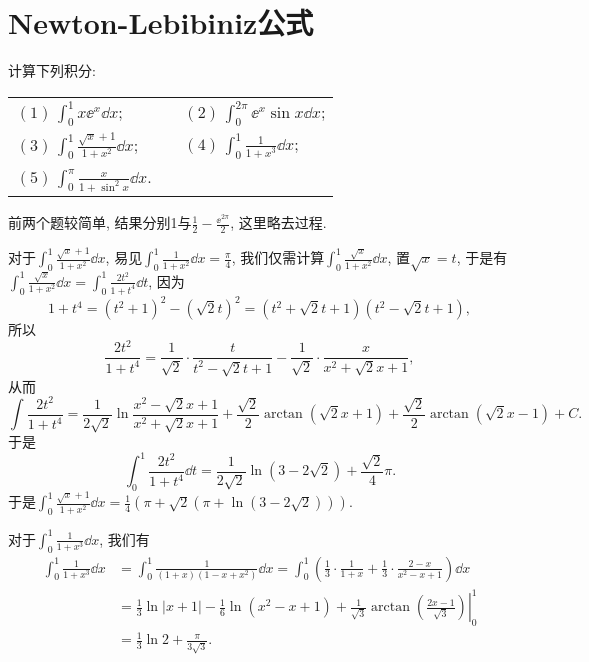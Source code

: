 \section{Newton-Lebibiniz公式}
\begin{quiza}
\woe 计算下列积分:\vspace{8pt}\\
\begin{tabular}{lcl}
\((1)\,\int_{0}^{1}x\ee^x\dd x\);&\qquad\qquad\qquad&\((2)\,\int_{0}^{2\pi}\ee^x\sin x\dd x\);\vspace{0.3cm}\\
\((3)\,\int_{0}^{1}\frac{\sqrt{x}+1}{1+x^2}\dd x\);&&\((4)\,\int_{0}^{1}\frac{1}{1+x^3}\dd x\);\vspace{0.3cm}\\
\((5)\,\int_{0}^{\pi}\frac{x}{1+\sin^2x}\dd x\).&&\vspace{0.3cm}\\
\end{tabular}
\tcbline
前两个题较简单, 结果分别1与\(\frac{1}{2}-\frac{\ee^{2\pi}}{2}\), 这里略去过程.
\tcbline

对于\(\int_{0}^{1}\frac{\sqrt{x}+1}{1+x^2}\dd x\), 易见\(\int_{0}^{1}\frac{1}{1+x^2}\dd x=\frac{\pi}{4}\), 我们仅需计算\(\int_{0}^{1}\frac{\sqrt{x}}{1+x^2}\dd x\), 置\(\sqrt{x}=t\), 于是有\(\int_{0}^{1}\frac{\sqrt{x}}{1+x^2}\dd x=\int_{0}^{1}\frac{2t^2}{1+t^4}\dd t\), 因为\[1+t^4=(t^2+1)^2-\left(\sqrt{2}t\right)^2=\left(t^2+\sqrt{2}t+1\right)\left(t^2-\sqrt{2}t+1\right),\]所以\[\frac{2t^2}{1+t^4}=\frac{1}{\sqrt{2}}\cdot\frac{t}{t^2-\sqrt{2}t+1}-\frac{1}{\sqrt{2}}\cdot\frac{x}{x^2+\sqrt{2}x+1},\]从而\[\int\frac{2t^2}{1+t^4}=\frac{1}{2\sqrt{2}}\ln\frac{x^2-\sqrt{2}x+1}{x^2+\sqrt{2}x+1}+\frac{\sqrt{2}}{2}\arctan\left(\sqrt{2}x+1\right)+\frac{\sqrt{2}}{2}\arctan\left(\sqrt{2}x-1\right)+C.\]于是\[\int_{0}^{1}\frac{2t^2}{1+t^4}\dd t=\frac{1}{2\sqrt{2}}\ln\left(3-2\sqrt{2}\right)+\frac{\sqrt{2}}{4}\pi.\]于是\(\int_{0}^{1}\frac{\sqrt{x}+1}{1+x^2}\dd x=\frac{1}{4}\left(\pi+\sqrt{2}\left(\pi+\ln\left(3-2\sqrt{2}\right)\right)\right)\).
\tcbline

对于\(\int_{0}^{1}\frac{1}{1+x^3}\dd x\), 我们有\[\begin{split}
\int_{0}^{1}\frac{1}{1+x^3}\dd x&=\int_{0}^{1}\frac{1}{(1+x)(1-x+x^2)}\dd x=\int_{0}^{1}\left(\frac{1}{3}\cdot\frac{1}{1+x}+\frac{1}{3}\cdot\frac{2-x}{x^2-x+1}\right)\dd x\\&=\left.\frac{1}{3}\ln\left|x+1\right|-\frac{1}{6}\ln(x^2-x+1)+\frac{1}{\sqrt{3}}\arctan\left(\frac{2x-1}{\sqrt{3}}\right)\right|^1_0\\&=\frac{1}{3}\ln 2+\frac{\pi}{3\sqrt{3}}.
\end{split}\]
\tcbline


\end{quiza}
